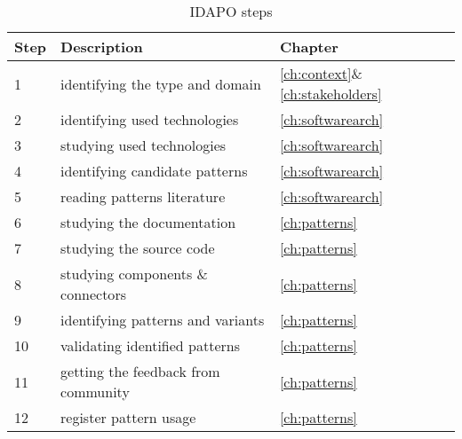 \begin{table}[H]
\caption{IDAPO steps}
\label{table:idaposteps}


\begin{tabular}{l l l}

\textbf{Step} & \textbf{Description} & \textbf{Chapter} \\
\toprule
1 & identifying the type and domain & \ref{ch:context}\&\ref{ch:stakeholders} \\
2 & identifying used technologies & \ref{ch:softwarearch} \\
3 & studying used technologies & \ref{ch:softwarearch} \\
4 & identifying candidate patterns & \ref{ch:softwarearch} \\
5 	& 	reading patterns literature 	& 	\ref{ch:softwarearch} 	\\
6 	& 	studying the documentation 		& 	\ref{ch:patterns} 		\\
7 	& 	studying the source code 		&	\ref{ch:patterns} \\
8 & studying components \& connectors 	&	\ref{ch:patterns} \\
9 & identifying patterns and variants 	&	\ref{ch:patterns} \\
10 & validating identified patterns 	& 	\ref{ch:patterns} \\
11 & getting the feedback from community 	&	\ref{ch:patterns} \\
12 & register pattern usage 				&	\ref{ch:patterns} \\
\end{tabular}


\end{table}


